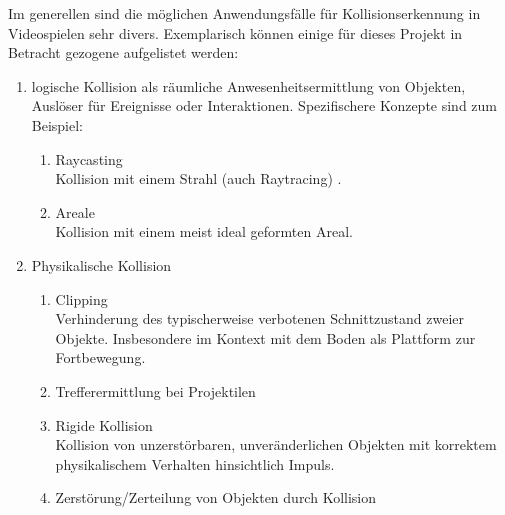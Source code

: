 \label{sec:usages}
Im generellen sind die möglichen Anwendungsfälle für Kollisionserkennung in Videospielen sehr divers. Exemplarisch können einige für dieses Projekt in Betracht gezogene aufgelistet werden:

\begin{enumerate}
	\item logische Kollision als räumliche Anwesenheitsermittlung von Objekten, Auslöser für Ereignisse oder Interaktionen. Spezifischere Konzepte sind zum Beispiel: 
		\begin{enumerate}
			\item Raycasting\\
	Kollision mit einem Strahl (auch Raytracing) \cite[ch.6 , p.131]{fourcrossfour}.
			\item Areale\\
	Kollision mit einem meist ideal geformten Areal.
		\end{enumerate}
	\item Physikalische Kollision
		\begin{enumerate}
			\item Clipping\\
	Verhinderung des typischerweise verbotenen Schnittzustand zweier Objekte. Insbesondere im Kontext mit dem Boden als Plattform zur Fortbewegung.
			\item Trefferermittlung bei Projektilen
			\item Rigide Kollision\\
		Kollision von unzerstörbaren, unveränderlichen Objekten mit korrektem physikalischem Verhalten hinsichtlich Impuls.
			\item Zerstörung/Zerteilung von Objekten durch Kollision
		\end{enumerate}
\end{enumerate}
